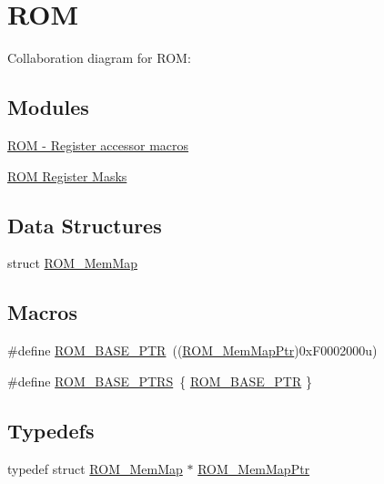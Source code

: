 \hypertarget{group___r_o_m___peripheral}{}\section{R\+OM}
\label{group___r_o_m___peripheral}
Collaboration diagram for R\+OM\+:
\subsection*{Modules}
\begin{DoxyCompactItemize}
\item 
\hyperlink{group___r_o_m___register___accessor___macros}{R\+O\+M -\/ Register accessor macros}
\item 
\hyperlink{group___r_o_m___register___masks}{R\+O\+M Register Masks}
\end{DoxyCompactItemize}
\subsection*{Data Structures}
\begin{DoxyCompactItemize}
\item 
struct \hyperlink{struct_r_o_m___mem_map}{R\+O\+M\+\_\+\+Mem\+Map}
\end{DoxyCompactItemize}
\subsection*{Macros}
\begin{DoxyCompactItemize}
\item 
\#define \hyperlink{group___r_o_m___peripheral_ga5ad426d10b6832ca7012e8767113f686}{R\+O\+M\+\_\+\+B\+A\+S\+E\+\_\+\+P\+TR}~((\hyperlink{group___r_o_m___peripheral_ga443285c54b394d010d2dccd28607e4b4}{R\+O\+M\+\_\+\+Mem\+Map\+Ptr})0x\+F0002000u)
\item 
\#define \hyperlink{group___r_o_m___peripheral_ga41e000a3e59f16dd8f395cebcb883e82}{R\+O\+M\+\_\+\+B\+A\+S\+E\+\_\+\+P\+T\+RS}~\{ \hyperlink{group___r_o_m___peripheral_ga5ad426d10b6832ca7012e8767113f686}{R\+O\+M\+\_\+\+B\+A\+S\+E\+\_\+\+P\+TR} \}
\end{DoxyCompactItemize}
\subsection*{Typedefs}
\begin{DoxyCompactItemize}
\item 
typedef struct \hyperlink{struct_r_o_m___mem_map}{R\+O\+M\+\_\+\+Mem\+Map} $\ast$ \hyperlink{group___r_o_m___peripheral_ga443285c54b394d010d2dccd28607e4b4}{R\+O\+M\+\_\+\+Mem\+Map\+Ptr}
\end{DoxyCompactItemize}



